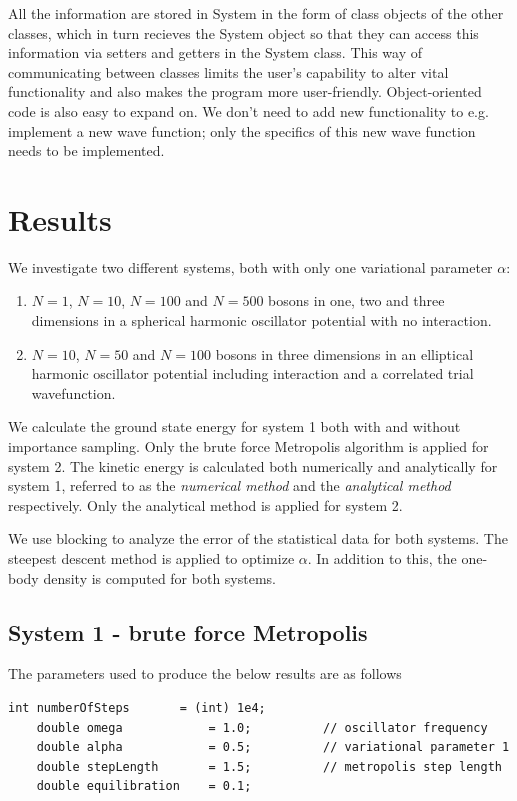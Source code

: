 \documentclass[english, a4paper]{article}
\begin{document}
\noindent All the information are stored in System in the form of class objects of the other classes, which in turn 
recieves the System object so that they can access this information via
setters and getters in the System class. This way of communicating between classes limits the user's 
capability to alter vital functionality and also makes the program more user-friendly. 
Object-oriented code is also easy to expand on. We don't need to add new functionality to
e.g. implement a new wave function; only the specifics of this new wave function needs to be implemented. 


\section{Results}

We investigate two different systems, both with only one variational parameter $\alpha$:
\begin{enumerate}
 \item $N=1$, $N=10$, $N=100$ and $N=500$ bosons in one, two and three dimensions in a
       spherical harmonic oscillator potential with no interaction.       
 \item $N=10$, $N=50$ and $N=100$ bosons in three dimensions
       in an elliptical harmonic oscillator potential including interaction and a
       correlated trial wavefunction. 
\end{enumerate}

\noindent We calculate the ground state energy for system 1 both with and without importance sampling.
Only the brute force Metropolis algorithm is applied for system 2.
The kinetic energy is calculated both numerically and analytically for system 1, 
referred to as the \textit{numerical method} and the \textit{analytical method} respectively.
Only the analytical method is applied for system 2. 

\noindent We use blocking to analyze the error of the statistical data for both systems.
The steepest descent method is applied to optimize $\alpha$. 
In addition to this, the one-body density is computed for both systems.


\subsection{System 1 - brute force Metropolis}

The parameters used to produce the below results are as follows
\belowcaptionskip=-10pt
\begin{lstlisting}[label=parameters1,caption=Parameters brute force Metropolis system 1]
    int numberOfSteps       = (int) 1e4;
    double omega            = 1.0;          // oscillator frequency
    double alpha            = 0.5;          // variational parameter 1
    double stepLength       = 1.5;          // metropolis step length
    double equilibration    = 0.1;          
\end{lstlisting}
\end{document}
